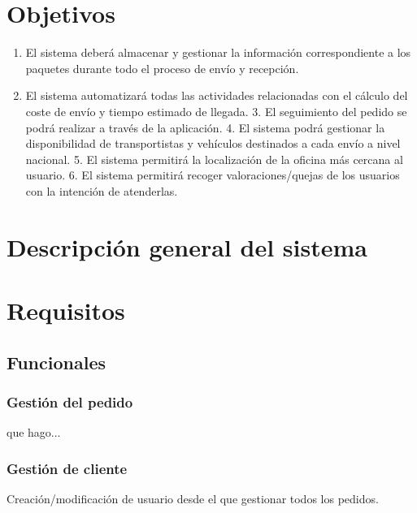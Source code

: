 \section{Objetivos}
\begin{enumerate}
	\item El sistema deberá almacenar y gestionar la información correspondiente a los paquetes durante todo el proceso de envío y recepción.
	\item El sistema automatizará todas las actividades relacionadas con el cálculo del coste de envío y tiempo estimado de llegada.
	3. El seguimiento del pedido se podrá realizar a través de la aplicación.
	4. El sistema podrá gestionar la disponibilidad de transportistas y vehículos destinados a cada envío a nivel nacional.
	5. El sistema permitirá la localización de la oficina más cercana al usuario.
	6. El sistema permitirá recoger valoraciones/quejas de los usuarios con la intención de atenderlas.
	
\end{enumerate} 

\newpage

\section{Descripción general del sistema}

\newpage

\section{Requisitos}
\subsection{Funcionales}
\subsubsection{Gestión del pedido}
que hago...

\subsubsection{Gestión de cliente}
Creación/modificación de usuario desde el que gestionar todos los pedidos.

